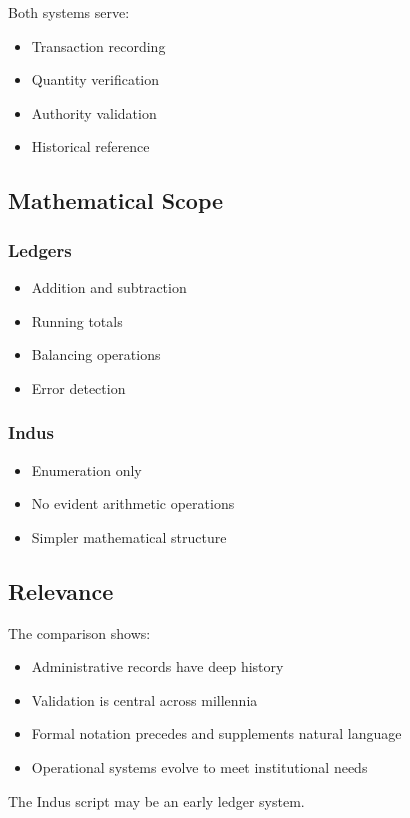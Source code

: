 Both systems serve:
\begin{itemize}
    \item Transaction recording
    \item Quantity verification
    \item Authority validation
    \item Historical reference
\end{itemize}

\subsection{Mathematical Scope}

\subsubsection{Ledgers}
\begin{itemize}
    \item Addition and subtraction
    \item Running totals
    \item Balancing operations
    \item Error detection
\end{itemize}

\subsubsection{Indus}
\begin{itemize}
    \item Enumeration only
    \item No evident arithmetic operations
    \item Simpler mathematical structure
\end{itemize}

\subsection{Relevance}

The comparison shows:
\begin{itemize}
    \item Administrative records have deep history
    \item Validation is central across millennia
    \item Formal notation precedes and supplements natural language
    \item Operational systems evolve to meet institutional needs
\end{itemize}

The Indus script may be an early ledger system.
